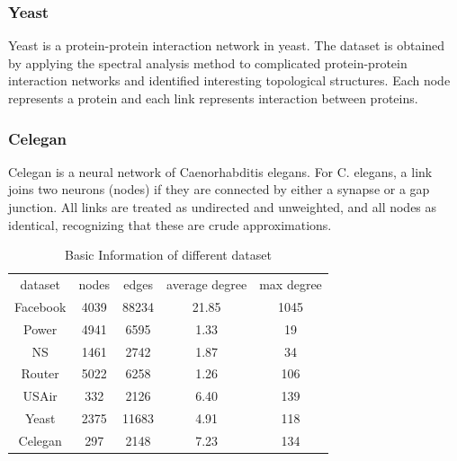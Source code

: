 \documentclass[12pt]{article}
\begin{document}
\subsubsection{Yeast}
Yeast is a protein-protein interaction network in yeast\cite{yeast}. The dataset is obtained by applying the spectral analysis method to complicated protein-protein interaction networks and identified interesting topological structures. Each node represents a protein and each link represents interaction between proteins. 
\subsubsection{Celegan}
Celegan is a neural network of Caenorhabditis elegans.\cite{small_world} For C. elegans, a link joins two neurons (nodes) if they are connected by either a synapse or a gap junction. All links are treated as undirected and unweighted, and all nodes as identical, recognizing that these are crude approximations.

\begin{table}
	\begin{center}
		\begin{tabular}{|c|c|c|c|c|}
			\hline
			dataset & nodes & edges & average degree & max degree \\
			Facebook & 4039 & 88234 & 21.85 & 1045 \\
			Power & 4941 & 6595 & 1.33 & 19 \\
			NS & 1461 & 2742 & 1.87 & 34 \\
			Router & 5022 & 6258 & 1.26 & 106 \\
			USAir & 332 & 2126 & 6.40 & 139 \\
			Yeast & 2375 & 11683 & 4.91 & 118 \\
			Celegan & 297 & 2148 & 7.23 & 134 \\
			\hline 
		\end{tabular}
		\caption{Basic Information of different dataset}
		\label{tab:info}
	\end{center}
\end{table}
\end{document}
